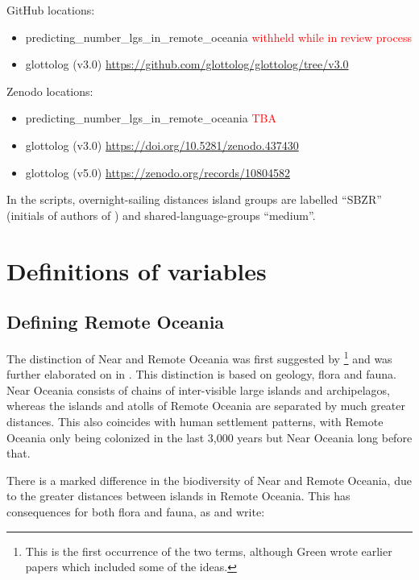 \documentclass[12pt,letterpaper]{article}
\begin{document}
GitHub locations:
\begin{itemize}
\item predicting\_number\_lgs\_in\_remote\_oceania  \textcolor{red}{withheld while in review process}
\item glottolog (v3.0) \url{https://github.com/glottolog/glottolog/tree/v3.0}
\end{itemize}

Zenodo locations:
\begin{itemize}
\item predicting\_number\_lgs\_in\_remote\_oceania  \textcolor{red}{TBA}
\item glottolog (v3.0) \url{https://doi.org/10.5281/zenodo.437430}
\item glottolog (v5.0) \url{https://zenodo.org/records/10804582}

\end{itemize}

In the scripts, overnight-sailing distances island groups are labelled ``SBZR'' (initials of authors of \cite{NZSA_overnight_2023}) and shared-language-groups ``medium''.
\newpage

\section{Definitions of variables}

\FloatBarrier
\subsection{Defining Remote Oceania}
The distinction of Near and Remote Oceania was first suggested by \citet{pawley1973dating}\footnote{This is the first occurrence of the two terms, although Green wrote earlier papers which included some of the ideas.} and was further elaborated on in \citet{green1991near}. This distinction is based on geology, flora and fauna. Near Oceania consists of chains of inter-visible large islands and archipelagos, whereas the islands and atolls of Remote Oceania are separated by much greater distances. This also coincides with human settlement patterns, with Remote Oceania only being colonized in the last 3,000 years but Near Oceania long before that.

There is a marked difference in the biodiversity of Near and Remote Oceania, due to the greater distances between islands in Remote Oceania. This has consequences for both flora and fauna, as \citet{green1991near} and \citet{pawley2007locatingoceanic} write:
\end{document}
